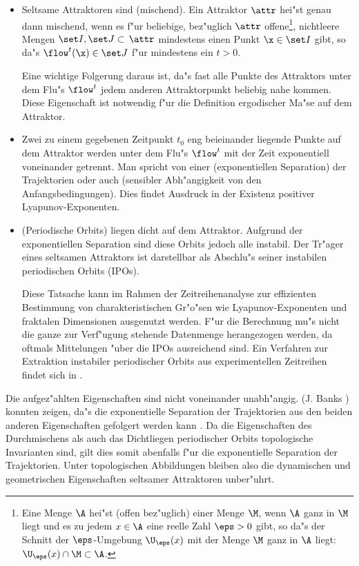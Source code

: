 \begin{itemize}
\item Seltsame Attraktoren sind \begriff(mischend).  Ein Attraktor $\attr$ hei"st genau
  dann mischend, wenn es f"ur beliebige, bez"uglich $\attr$ offene\footnote{Eine Menge
    $\A$ hei"st \begriff(offen bez"uglich) einer Menge $\M$, wenn $\A$ ganz in $\M$ liegt
    und es zu jedem $x\in\A$ eine reelle Zahl $\eps>0$ gibt, so da"s der Schnitt der
    $\eps$-Umgebung $\U_\eps(x)$ mit der Menge $\M$ ganz in $\A$ liegt: $\U_\eps(x) \cap
    \M \subset \A$.  }, nichtleere Mengen $\set I,\set J\subset\,\attr$ mindestens einen
  Punkt $\x\in\set I$ gibt, so da"s $\flow^t(\x)\in\set J$ f"ur mindestens ein $t>0$.


Eine wichtige Folgerung daraus ist, da"s fast alle Punkte
des Attraktors unter dem Flu"s $\flow^t$ jedem anderen Attraktorpunkt beliebig nahe
kommen. Diese Eigenschaft ist notwendig f"ur die Definition ergodischer Ma"se
auf dem Attraktor. 

\item Zwei zu einem gegebenen Zeitpunkt $t_0$ eng beieinander liegende Punkte auf dem Attraktor
werden unter dem Flu"s $\flow^t$ mit der Zeit exponentiell voneinander getrennt. Man spricht von einer 
\begriff(exponentiellen Separation) der Trajektorien oder auch \begriff(sensibler
Abh"angigkeit von den Anfangsbedingungen). Dies findet Ausdruck in der Existenz positiver
Lyapunov-Exponenten.

\item \begriff(Periodische Orbits) liegen dicht auf dem Attraktor. Aufgrund der
  exponentiellen Separation sind diese Orbits jedoch alle instabil. Der Tr"ager eines
  seltsamen Attraktors ist darstellbar als Abschlu"s seiner instabilen periodischen Orbits
  (IPOs).
  
  Diese Tatsache kann im Rahmen der Zeitreihenanalyse zur effizienten Bestimmung von
  charakteristischen Gr"o"sen wie Lyapunov-Exponenten und fraktalen Dimensionen ausgenutzt
  werden. F"ur die Berechnung mu"s nicht die ganze zur Verf"ugung stehende Datenmenge
  herangezogen werden, da oftmals Mittelungen "uber die IPOs ausreichend sind.  Ein
  Verfahren zur Extraktion instabiler periodischer Orbits aus experimentellen Zeitreihen
  findet sich in \cite{Pawelzik91,Pawelzik91a}.
\end{itemize}
Die aufgez"ahlten Eigenschaften sind nicht voneinander unabh"angig. \autor(J. Banks \etal)
konnten zeigen, da"s die exponentielle Separation der Trajektorien aus den beiden anderen
Eigenschaften gefolgert werden kann \cite{Banks92}. Da die Eigenschaften des Durchmischens
als auch das Dichtliegen periodischer Orbits topologische Invarianten sind, gilt
dies somit abenfalls f"ur die exponentielle Separation der Trajektorien. Unter
topologischen Abbildungen bleiben also die dynamischen und geometrischen Eigenschaften
seltsamer Attraktoren unber"uhrt.

